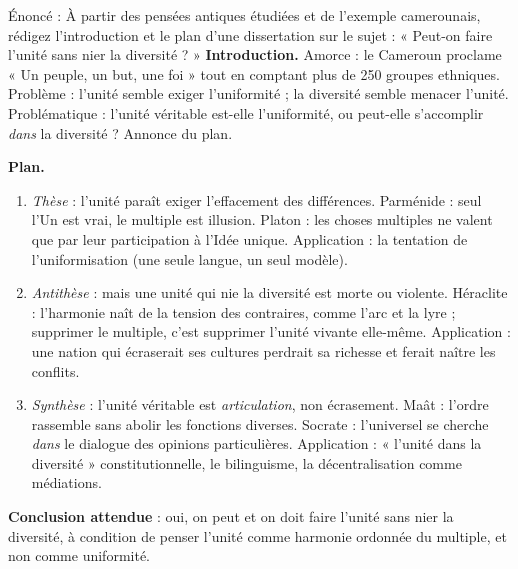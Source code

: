 \documentclass[11pt]{article}
\begin{document}
\begin{exoresolu}
Énoncé : À partir des pensées antiques étudiées et de l'exemple camerounais, rédigez l'introduction et le plan d'une dissertation sur le sujet : « Peut-on faire l'unité sans nier la diversité ? »
\tcblower
\textbf{Introduction.} Amorce : le Cameroun proclame « Un peuple, un but, une foi » tout en comptant plus de 250 groupes ethniques. Problème : l'unité semble exiger l'uniformité ; la diversité semble menacer l'unité. Problématique : l'unité véritable est-elle l'uniformité, ou peut-elle s'accomplir \emph{dans} la diversité ? Annonce du plan.

\textbf{Plan.}
\begin{enumerate}
\item \emph{Thèse} : l'unité paraît exiger l'effacement des différences. Parménide : seul l'Un est vrai, le multiple est illusion. Platon : les choses multiples ne valent que par leur participation à l'Idée unique. Application : la tentation de l'uniformisation (une seule langue, un seul modèle).
\item \emph{Antithèse} : mais une unité qui nie la diversité est morte ou violente. Héraclite : l'harmonie naît de la tension des contraires, comme l'arc et la lyre ; supprimer le multiple, c'est supprimer l'unité vivante elle-même. Application : une nation qui écraserait ses cultures perdrait sa richesse et ferait naître les conflits.
\item \emph{Synthèse} : l'unité véritable est \emph{articulation}, non écrasement. Maât : l'ordre rassemble sans abolir les fonctions diverses. Socrate : l'universel se cherche \emph{dans} le dialogue des opinions particulières. Application : « l'unité dans la diversité » constitutionnelle, le bilinguisme, la décentralisation comme médiations.
\end{enumerate}
\textbf{Conclusion attendue} : oui, on peut et on doit faire l'unité sans nier la diversité, à condition de penser l'unité comme harmonie ordonnée du multiple, et non comme uniformité.
\end{exoresolu}
\end{document}

